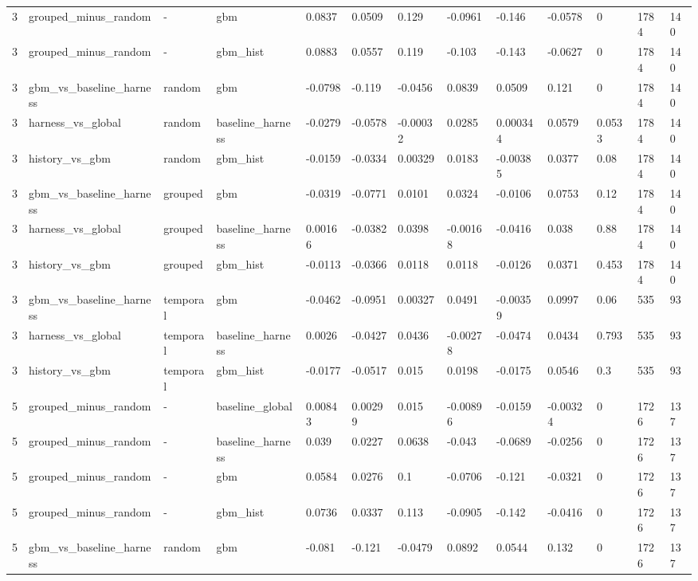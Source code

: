 \begin{tabular}{lllllllllllll}
3 & grouped\_minus\_random & - & gbm & 0.0837 & 0.0509 & 0.129 & -0.0961 & -0.146 & -0.0578 & 0 & 1784 & 140 \\
3 & grouped\_minus\_random & - & gbm\_hist & 0.0883 & 0.0557 & 0.119 & -0.103 & -0.143 & -0.0627 & 0 & 1784 & 140 \\
3 & gbm\_vs\_baseline\_harness & random & gbm & -0.0798 & -0.119 & -0.0456 & 0.0839 & 0.0509 & 0.121 & 0 & 1784 & 140 \\
3 & harness\_vs\_global & random & baseline\_harness & -0.0279 & -0.0578 & -0.00032 & 0.0285 & 0.000344 & 0.0579 & 0.0533 & 1784 & 140 \\
3 & history\_vs\_gbm & random & gbm\_hist & -0.0159 & -0.0334 & 0.00329 & 0.0183 & -0.00385 & 0.0377 & 0.08 & 1784 & 140 \\
3 & gbm\_vs\_baseline\_harness & grouped & gbm & -0.0319 & -0.0771 & 0.0101 & 0.0324 & -0.0106 & 0.0753 & 0.12 & 1784 & 140 \\
3 & harness\_vs\_global & grouped & baseline\_harness & 0.00166 & -0.0382 & 0.0398 & -0.00168 & -0.0416 & 0.038 & 0.88 & 1784 & 140 \\
3 & history\_vs\_gbm & grouped & gbm\_hist & -0.0113 & -0.0366 & 0.0118 & 0.0118 & -0.0126 & 0.0371 & 0.453 & 1784 & 140 \\
3 & gbm\_vs\_baseline\_harness & temporal & gbm & -0.0462 & -0.0951 & 0.00327 & 0.0491 & -0.00359 & 0.0997 & 0.06 & 535 & 93 \\
3 & harness\_vs\_global & temporal & baseline\_harness & 0.0026 & -0.0427 & 0.0436 & -0.00278 & -0.0474 & 0.0434 & 0.793 & 535 & 93 \\
3 & history\_vs\_gbm & temporal & gbm\_hist & -0.0177 & -0.0517 & 0.015 & 0.0198 & -0.0175 & 0.0546 & 0.3 & 535 & 93 \\
5 & grouped\_minus\_random & - & baseline\_global & 0.00843 & 0.00299 & 0.015 & -0.00896 & -0.0159 & -0.00324 & 0 & 1726 & 137 \\
5 & grouped\_minus\_random & - & baseline\_harness & 0.039 & 0.0227 & 0.0638 & -0.043 & -0.0689 & -0.0256 & 0 & 1726 & 137 \\
5 & grouped\_minus\_random & - & gbm & 0.0584 & 0.0276 & 0.1 & -0.0706 & -0.121 & -0.0321 & 0 & 1726 & 137 \\
5 & grouped\_minus\_random & - & gbm\_hist & 0.0736 & 0.0337 & 0.113 & -0.0905 & -0.142 & -0.0416 & 0 & 1726 & 137 \\
5 & gbm\_vs\_baseline\_harness & random & gbm & -0.081 & -0.121 & -0.0479 & 0.0892 & 0.0544 & 0.132 & 0 & 1726 & 137 \\

\end{tabular}
